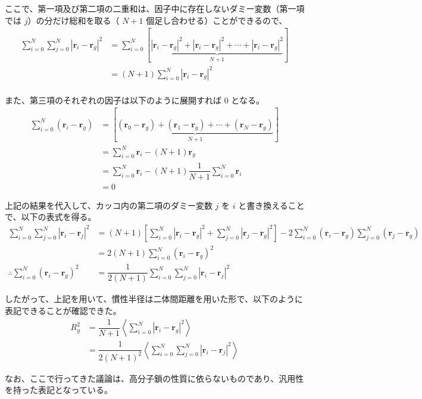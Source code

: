 \documentclass[a4paper,11pt]{ltjsarticle}
\begin{document}
\begin{appendix}
ここで、第一項及び第二項の二重和は、因子中に存在しないダミー変数（第一項では $j$）の分だけ総和を取る（ $N+1$ 個足し合わせる）ことができるので、
\begin{align*}
\sum_{i = 0}^N \sum_{j=0}^N \left| \bm{r}_i - \bm{r}_g \right|^2 
	&= \sum_{i = 0}^N \left[ \underbrace{ \left| \bm{r}_i - \bm{r}_g \right|^2 + \left| \bm{r}_i - \bm{r}_g \right|^2 + \cdots + \left|\bm{r}_i - \bm{r}_g \right|^2 }_{N+1} \right]\\
	&= (N+1) \sum_{i = 0}^N \left| \bm{r}_i - \bm{r}_g \right|^2 \\
\end{align*}

また、第三項のそれぞれの因子は以下のように展開すれば 0 となる。
\begin{align*}
\sum_{i=0}^N (\bm{r}_i - \bm{r}_g) 
	&= \left[ \underbrace{ (\bm{r}_0 - \bm{r}_g) + (\bm{r}_1 - \bm{r}_g) + \cdots + (\bm{r}_N - \bm{r}_g) }_{N+1}\right] \\
	&= \sum_{i=0}^N \bm{r}_i -(N+1) \bm{r}_g \\
	&= \sum_{i=0}^N \bm{r}_i -(N+1) \dfrac{1}{N+1} \sum_{i=0}^{N} \bm{r}_i \\
	&=0
\end{align*}

上記の結果を代入して、カッコ内の第二項のダミー変数 $j$ を $i$ と書き換えることで、以下の表式を得る。
\begin{align*}
\sum_{i = 0}^N \sum_{j=0}^N \left| \bm{r}_i - \bm{r}_j \right|^2
	&= (N + 1) \left[ \sum_{i=0}^N \left| \bm{r}_i - \bm{r}_g \right|^2 + \sum_{j=0}^N \left| \bm{r}_j - \bm{r}_g \right|^2 \right] -2 \sum_{i=0}^N (\bm{r}_i - \bm{r}_g) \sum_{j=0}^N (\bm{r}_j - \bm{r}_g) \\
	&= 2(N + 1) \sum_{i=0}^N (\bm{r}_i- \bm{r}_g)^2 \\
\therefore \sum_{i=0}^N (\bm{r}_i- \bm{r}_g)^2 
	&= \dfrac{1}{2(N+1)} \sum_{i = 0}^N \sum_{j=0}^N \left| \bm{r}_i - \bm{r}_j \right|^2
\end{align*}

したがって、上記を用いて、慣性半径は二体間距離を用いた形で、以下のように表記できることが確認できた。
\begin{align*}
R_g^2 
	&= \dfrac{1}{N+1} \left\langle \sum_{i=0}^{N} |\bm{r}_i - \bm{r}_g|^2 \right\rangle \\
	&= \dfrac{1}{2(N+1)^2} \left \langle \sum_{i=0}^N \sum_{j=0}^N \left| \bm{r}_i - \bm{r}_j \right|^2 \right \rangle
\end{align*}

なお、ここで行ってきた議論は、高分子鎖の性質に依らないものであり、汎用性を持った表記となっている。


\end{appendix}
\end{document}
